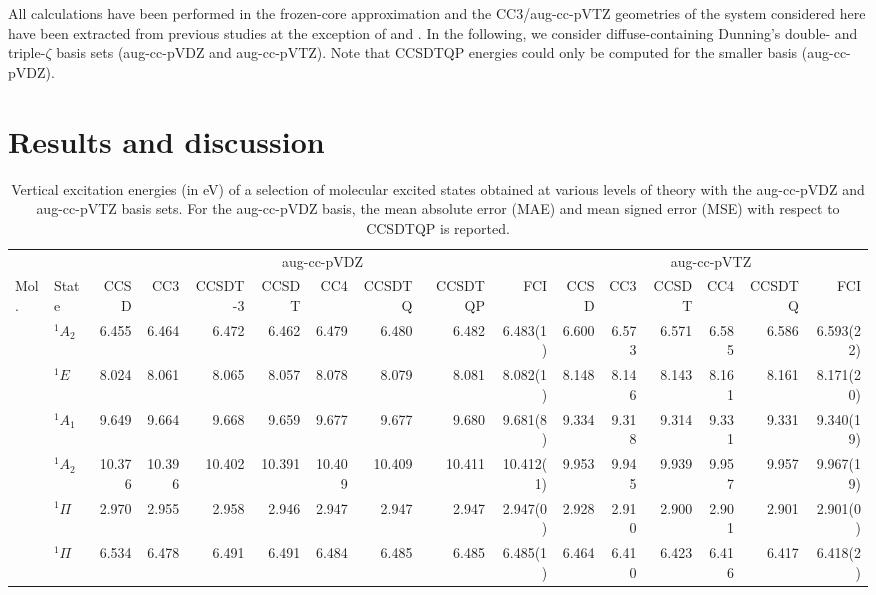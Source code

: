 \documentclass[aip,jcp,reprint,noshowkeys,superscriptaddress]{revtex4-1}
\newcommand{\mc}{\multicolumn}
\begin{document}
All calculations have been performed in the frozen-core approximation and the CC3/aug-cc-pVTZ geometries of the system considered here have been extracted from previous studies at the exception of  and . \cite{Loos_2018a}
In the following, we consider diffuse-containing Dunning's double- and triple-$\zeta$ basis sets (aug-cc-pVDZ and aug-cc-pVTZ).
Note that CCSDTQP energies could only be computed for the smaller basis (aug-cc-pVDZ).

\section{Results and discussion}


\begin{squeezetable}
\begin{table}
	\caption{Vertical excitation energies (in eV) of a selection of molecular excited states obtained at various levels of theory with the aug-cc-pVDZ and aug-cc-pVTZ basis sets. 
	For the aug-cc-pVDZ basis, the mean absolute error (MAE) and mean signed error (MSE) with respect to CCSDTQP is reported.
	\label{tab:BigTab}}
	\begin{ruledtabular}
	\begin{tabular}{llrrrrrrrrrrrrrr}
				&		&	\mc{8}{c}{aug-cc-pVDZ}		&		\mc{6}{c}{aug-cc-pVTZ}		\\	
				\cline{3-10} \cline{11-16}
	Mol.	&	State				&CCSD	&CC3	&CCSDT-3&CCSDT	&CC4	&CCSDTQ	&CCSDTQP	&FCI	
									&CCSD	&CC3	&CCSDT	&CC4	&CCSDTQ	&FCI			\\
	\hline
	\ce{NH3}	&	$^1A_2$ 		&6.455	&6.464	&6.472	&6.462	&6.479	&6.480	&6.482	&6.483(1)	&6.600	&6.573	&6.571	&6.585	&6.586	&6.593(22)	\\	
				&	$^1E$			&8.024	&8.061	&8.065	&8.057	&8.078	&8.079	&8.081	&8.082(1)	&8.148	&8.146	&8.143	&8.161	&8.161	&8.171(20)	\\	
				&	$^1A_1$ 		&9.649	&9.664	&9.668	&9.659	&9.677	&9.677	&9.680	&9.681(8)	&9.334	&9.318	&9.314	&9.331	&9.331	&9.340(19)	\\
				&	$^1A_2$ 		&10.376	&10.396	&10.402	&10.391	&10.409	&10.409	&10.411	&10.412(1)	&9.953	&9.945	&9.939	&9.957	&9.957	&9.967(19)	\\
	\ce{BH}		&	$^1\Pi$ 		&2.970	&2.955	&2.958	&2.946	&2.947	&2.947	&2.947	&2.947(0)	&2.928	&2.910	&2.900	&2.901	&2.901	&2.901(0)	\\
	\ce{BF}		&	$^1\Pi$ 		&6.534	&6.478	&6.491	&6.491	&6.484	&6.485	&6.485	&6.485(1)	&6.464	&6.410	&6.423	&6.416	&6.417	&6.418(2)\\

\end{tabular}
\end{ruledtabular}
\end{table}
\end{squeezetable}
\end{document}
